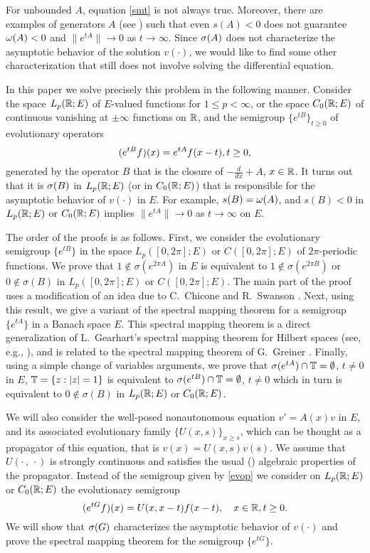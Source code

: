 For unbounded $A$, equation \eqref{smt} is not always true.  Moreover,
there are examples of generators $A$ (see \cite{21}) such that even
$s(A) <0$ does not guarantee
$\omega(A)<0$ and $\|e^{tA}\|\to 0$ as $t\to\infty$.  Since $\sigma (A)$ does
not characterize the asymptotic behavior of the solution
$v(\cdot)$, we would
like to find some other characterization that still does not involve
solving the differential equation.

In this paper we solve precisely this problem in the following manner.
Consider the space $L_p ({\Bbb{R}};E)$ of $E$-valued functions for $1\leq p
< \infty$, or the space $C_0 ({\Bbb{R}}; E)$ of continuous vanishing at $\pm
\infty$ functions on ${\Bbb{R}}$, and the semigroup $\{e^{tB}\}_{t\geq 0}$ of
evolutionary operators
\begin{equation}
(e^{tB}f) (x) =e^{tA} f(x-t), t \geq 0,
\lb{evop}
\end{equation}
generated by the operator $B$ that is the closure of $-\frac{d}{dx} +A$,
$x\in{\Bbb{R}}$.  It turns out that it is $\sigma (B)$ in $L_p ({\Bbb{R}};E)$ (or in
$C_0({\Bbb{R}}; E)$) that is responsible for the asymptotic behavior of $v(\cdot)$
in $E$.  For example, $s(B) =\omega(A)$, and $s(B) <0$ in $L_p ({\Bbb{R}};E)$ or
$C_0 ({\Bbb{R}};E)$ implies $\|e^{tA}\| \to 0$ as $t\to\infty$ on $E$.

The order of the proofs is as follows. First, we consider the
evolutionary semigroup $\{e^{tB}\}$ in the space $L_p([0,2\pi];E)$
or $C([0,2\pi];E)$ of $2\pi$-periodic functions. We prove that
$1\notin \sigma (e^{2\pi A})$ in $E$ is equivalent to
$1\notin \sigma (e^{2\pi B})$
or $0\notin \sigma (B)$ in $L_p([0,2\pi];E)$ or
$C([0,2\pi];E)$. The main part of the proof
uses a modification of an idea due to C.~Chicone and R.~Swanson
\cite{6}. Next, using this result, we give a variant of the
spectral mapping theorem for a semigroup $\{e^{tA}\}$ in a Banach
space $E$. This spectral mapping theorem is a direct generalization
of L.~Gearhart's spectral mapping theorem for Hilbert spaces
(see, e.g.,
\cite[p. 95]{21}),
and is related to the spectral mapping theorem of
G.~Greiner \cite[p. 94]{21}. Finally, using a simple change
of variables arguments, we prove that
$\sigma (e^{tA})\cap {\Bbb{T}} =\emptyset$, $t\neq 0$
in $E$, ${\Bbb{T}} =\{z: |z|=1\}$
is equivalent to
$\sigma (e^{tB})\cap {\Bbb{T}} =\emptyset$, $t\neq 0$
which in turn is equivalent to $0\notin\sigma (B)$
in $L_p({\Bbb{R}}; E)$ or $C_0({\Bbb{R}}; E)$.

We will also consider the well-posed nonautonomous equation $v'=A(x) v$
in $E$, and its associated
evolutionary family $\{U(x,s)\}_{x \geq s}$,
which can be thought
as a propagator of this equation, that is
$v(x) =U(x,s)v(s)$. We assume that
$U(\cdot\, , \, \cdot)$ is strongly continuous and satisfies the usual
(\cite[p.~89]{31}) algebraic properties of the propagator.
Instead of the semigroup given by \eqref{evop} we consider on $L_p
({\Bbb{R}};E)$ or $C_0 ({\Bbb{R}}; E)$ the evolutionary semigroup
\begin{equation}
(e^{tG} f)(x) =U(x,x-t) f(x-t), \quad x\in\bbR, t\geq 0.
\lb{eve}
\end{equation}
We will show that $\sigma (G)$ characterizes the asymptotic behavior of
$v(\cdot)$ and prove the spectral mapping theorem for the semigroup
$\{e^{tG}\}$.

